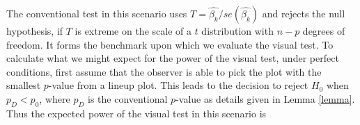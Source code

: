 \documentclass[12pt]{article}
\newcommand{\red}[1]{{\color{red} #1}}
\begin{document}

The conventional test in this scenario uses $T= \hat{\beta_k}/ se(\hat{\beta_k})$ and rejects the null hypothesis, if $T$ is extreme on the scale of a $t$ distribution with $n-p$ degrees of freedom.  It forms the benchmark upon which we evaluate the visual test. To calculate what we might expect for the power of the visual test, under perfect conditions, first assume that the observer is able to pick the plot with the smallest $p$-value from a lineup plot.  This leads to the decision to reject $H_0$ when $p_{D} < p_0$, where $p_{D}$ is the conventional $p$-value as details given in Lemma \ref{lemma}. Thus the expected power of the visual test in this scenario is
\end{document}
